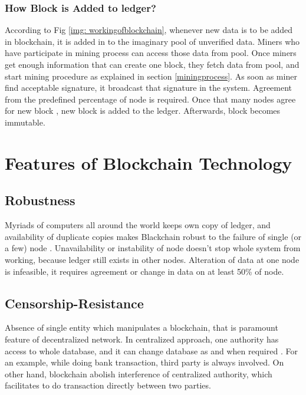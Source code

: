\documentclass[a4paper,twoside,12pt]{report}
\begin{document}
\begin{spacing}{1.5}
\subsubsection{How Block is Added to ledger?}
According to Fig \ref{img: workingofblockchain}, whenever new data is to be added in blockchain, it is added in to the imaginary pool of unverified data. Miners who have participate in mining process can access those data from pool. Once miners get enough information that can create one block, they fetch data from pool, and start mining procedure as explained in section \ref{miningprocess}. As soon as miner find acceptable signature, it broadcast that signature in the system. Agreement from the predefined percentage of node is required. Once that many nodes agree for new block , new block is added to the ledger. Afterwards, block becomes immutable.
\section{Features of Blockchain Technology}
\subsection{Robustness}
Myriads of computers all around the world keeps own copy of ledger, and availability of duplicate copies makes Blackchain robust to the failure of single (or a few) node \cite{satoshinakamoto}. Unavailability or instability of node doesn't stop whole system from working, because ledger still exists in other nodes. Alteration of data at one node is infeasible, it requires agreement or change in data on at least 50\% of node.
\subsection{Censorship-Resistance}
Absence of single entity which manipulates a blockchain, that is paramount feature of decentralized network. In centralized approach, one authority has access to whole database, and it can change database as and when required \cite{satoshinakamoto}. For an example, while doing bank transaction, third party is always involved. On other hand, blockchain abolish interference of centralized authority, which facilitates to do transaction directly between two parties.

\end{spacing}
\end{document}
